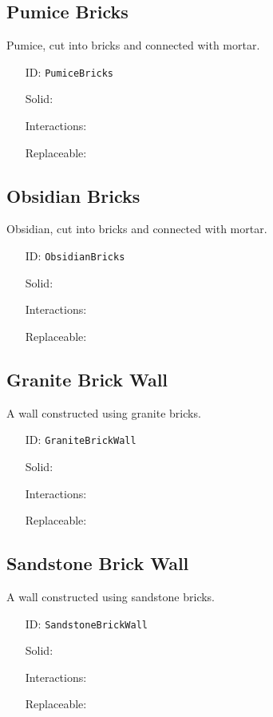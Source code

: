 \subsection{Pumice Bricks}\label{subsec:blocks_pumice bricks}
Pumice, cut into bricks and connected with mortar.
\newline
\begin{itemize}[nosep]
\item[ID:] \texttt{PumiceBricks}
\item[Solid:]  \Checkmark \item[Interactions:]  \XSolidBrush \item[Replaceable:]  \XSolidBrush \end{itemize}

\subsection{Obsidian Bricks}\label{subsec:blocks_obsidian bricks}
Obsidian, cut into bricks and connected with mortar.
\newline
\begin{itemize}[nosep]
\item[ID:] \texttt{ObsidianBricks}
\item[Solid:]  \Checkmark \item[Interactions:]  \XSolidBrush \item[Replaceable:]  \XSolidBrush \end{itemize}

\subsection{Granite Brick Wall}\label{subsec:blocks_granite brick wall}
A wall constructed using granite bricks.
\newline
\begin{itemize}[nosep]
\item[ID:] \texttt{GraniteBrickWall}
\item[Solid:]  \Checkmark \item[Interactions:]  \XSolidBrush \item[Replaceable:]  \XSolidBrush \end{itemize}

\subsection{Sandstone Brick Wall}\label{subsec:blocks_sandstone brick wall}
A wall constructed using sandstone bricks.
\newline
\begin{itemize}[nosep]
\item[ID:] \texttt{SandstoneBrickWall}
\item[Solid:]  \Checkmark \item[Interactions:]  \XSolidBrush \item[Replaceable:]  \XSolidBrush \end{itemize}

